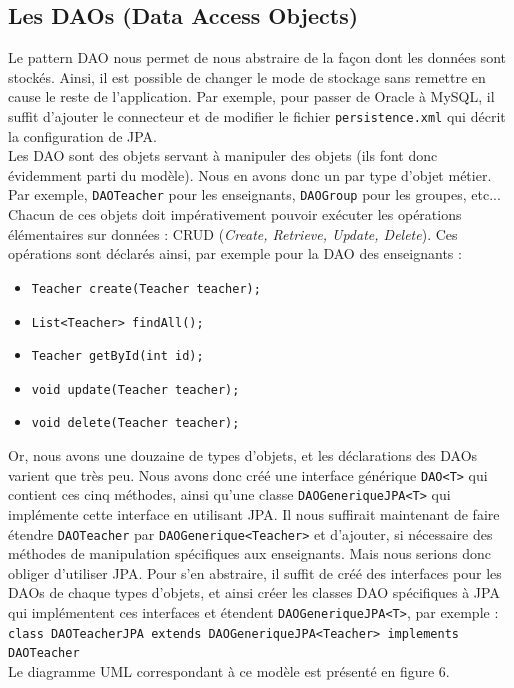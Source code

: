 \documentclass{article}
\begin{document}
\newpage

\subsection{Les DAOs (Data Access Objects)}
Le pattern DAO nous permet de nous abstraire de la façon dont les données sont stockés. Ainsi, il est possible de changer le mode de stockage sans remettre en cause le reste de l'application. Par exemple, pour passer de Oracle à MySQL, il suffit d'ajouter le connecteur et de modifier le fichier \texttt{persistence.xml} qui décrit la configuration de JPA. \\

Les DAO sont des objets servant à manipuler des objets (ils font donc évidemment parti du modèle). Nous en avons donc un par type d'objet métier. Par exemple, \texttt{DAOTeacher} pour les enseignants, \texttt{DAOGroup} pour les groupes, etc... Chacun de ces objets doit impérativement pouvoir exécuter les opérations élémentaires sur données : CRUD (\textit{Create, Retrieve, Update, Delete}). Ces opérations sont déclarés ainsi, par exemple pour la DAO des enseignants :
\begin{itemize}
\item \texttt{Teacher create(Teacher teacher);}
\item \texttt{List<Teacher> findAll();}
\item \texttt{Teacher getById(int id);}
\item \texttt{void update(Teacher teacher);}
\item \texttt{void delete(Teacher teacher);}
\end{itemize}
Or, nous avons une douzaine de types d'objets, et les déclarations des DAOs varient que très peu. Nous avons donc créé une interface générique \texttt{DAO<T>} qui contient ces cinq méthodes, ainsi qu'une classe \texttt{DAOGeneriqueJPA<T>} qui implémente cette interface en utilisant JPA. Il nous suffirait maintenant de faire étendre \texttt{DAOTeacher} par \texttt{DAOGenerique<Teacher>} et d'ajouter, si nécessaire des méthodes de manipulation spécifiques aux enseignants. Mais nous serions donc obliger d'utiliser JPA. Pour s'en abstraire, il suffit de créé des interfaces pour les DAOs de chaque types d'objets, et ainsi créer les classes DAO spécifiques à JPA qui implémentent ces interfaces et étendent \texttt{DAOGeneriqueJPA<T>}, par exemple : \\
\texttt{class DAOTeacherJPA extends DAOGeneriqueJPA<Teacher> implements DAOTeacher} \\
Le diagramme UML correspondant à ce modèle est présenté en figure 6. \\
\end{document}
